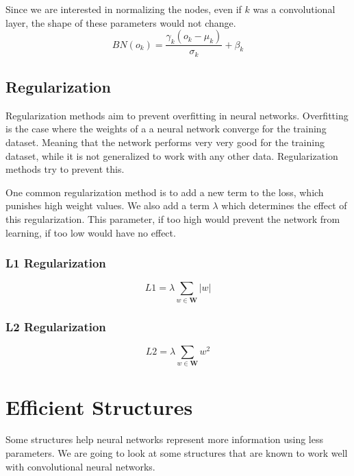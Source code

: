 Since we are interested in normalizing the nodes, even if $k$ was a convolutional layer, the shape of these parameters would not change.
$$ BN(o_k) = \frac{\gamma_k(o_k-\mu_k)}{\sigma_k}+\beta_k $$

\subsection{Regularization}
Regularization methods aim to prevent overfitting in neural networks. Overfitting is the case where the weights of a a neural network converge for the training dataset. Meaning that the network performs very very good for the training dataset, while it is not generalized to work with any other data. Regularization methods try to prevent this.

One common regularization method is to add a new term to the loss, which punishes high weight values. We also add a term $\lambda$ which determines the effect of this regularization. This parameter, if too high would prevent the network from learning, if too low would have no effect. 

\subsubsection{L1 Regularization}
$$ L1 = \lambda \sum_{w \in \mathbf{W}} |w| $$

\subsubsection{L2 Regularization}
$$ L2 = \lambda \sum_{w \in \mathbf{W}} w^2 $$

\section{Efficient Structures}
Some structures help neural networks represent more information using less parameters. We are going to look at some structures that are known to work well with convolutional neural networks.

\iffalse
\todoin{I am not adding this because we are not using Inception blocks anywhere in this thesis.}
\subsection{Inception Blocks}
An inception block (\cite{Szegedy:2014aa}, \cite{Szegedy_2016_CVPR}, \cite{DBLP:journals/corr/SzegedyIV16}) is a combination of various layers. The inception block $k$ gets an input $o_{k-1}$ then applies multiple convolutional (or pooling) layers to this input. The results of these layers are combined to produce the output of the inception block. There are different combinations of inception blocks. 
\fi

